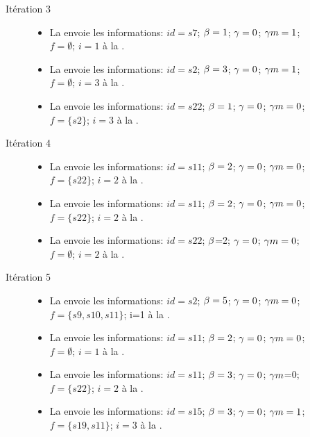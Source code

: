 \begin{Exemple}
\begin{description}
\begin{itemize}
			\end{itemize}	
\item[Itération 3]
		\begin{itemize}
			\item  La \mtwo{} envoie les informations: $id =s7$; $\beta{}=1$; $\gamma{}=0$; $\gamma m{}=1$;\\$f =\emptyset$; $i=1$ à la \mone{}.
			\item  La \mtree{} envoie les informations: $id =s2$; $\beta{}=3$; $\gamma{}=0$; $\gamma m{}=1$;\\$f =\emptyset$; $i=3$ à la \mone{}.
			\item  La \mtree{} envoie les informations: $id =s22$; $\beta{}=1$; $\gamma{}=0$; $\gamma m{}=0$;\\$f =\{s2\}$; $i=3$ à la \mtwo{}.
			\end{itemize}
		\item[Itération 4]
		\begin{itemize}
			\item  La \mtwo{} envoie les informations: $id =s11$; $\beta{}=2$; $\gamma{}=0$; $\gamma m{}=0$;\\$f=\{s22\}$; $i=2$ à la \mone{}.
			\item  La \mtwo{} envoie les informations: $id =s11$; $\beta{}=2$; $\gamma{}=0$; $\gamma m{}=0$;\\$f=\{s22\}$; $i=2$ à la \mtree{}.
			\item  La \mtwo{} envoie les informations: $id =s22$; $\beta{}$=2; $\gamma{}=0$; $\gamma m{}=0$;\\$f=\emptyset$; $i=2$ à la \mtwo{}.
			\end{itemize}
			\item[Itération 5]
		\begin{itemize}
		\item  La \mone{} envoie les informations: $id =s2$; $\beta{}=5$; $\gamma{}=0$; $\gamma m{}=0$;\\$f=\{s9,s10,s11\}$; i=1 à la \mtree{}.
			\item  La \mone{} envoie les informations: $id =s11$; $\beta{}=2$; $\gamma{}=0$; $\gamma m{}=0$;\\$f=\emptyset$; $i=1$ à la \mtwo{}.
			\item  La \mtree{} envoie les informations: $id =s11$; $\beta{}=3$; $\gamma{}=0$; $\gamma m{}$=0;\\$f =\{s22\}$; $i=2$ à la \mtwo{}.
			\item La \mtree{} envoie les informations: $id =s15$; $\beta{}=3$; $\gamma{}=0$; $\gamma m{}=1$;\\$f=\{s19,s11\}$; $i=3$	 à la \mtwo{}.
			\end{itemize}	
	\end{description}

\end{Exemple}

